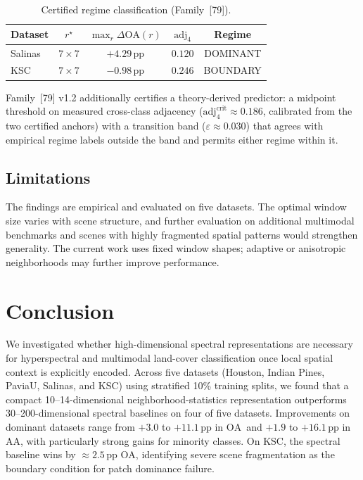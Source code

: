 \documentclass[journal]{IEEEtran}
\newcommand{\pp}{\,\text{pp}}
\newcommand{\OA}{\ensuremath{\mathrm{OA}}}
\newcommand{\Acc}{\ensuremath{\mathrm{AA}}}  %
\newcommand{\AdjSalinas}{0.120} %
\newcommand{\AdjKSC}{0.246}     %
\begin{document}
\begin{table}[t]
\centering
\caption{Certified regime classification (Family~[79]).}
\label{tab:regime-separator}
\begin{tabular}{lcccc}
\hline
Dataset & $r^\star$ & $\max_r \Delta\mathrm{OA}(r)$ & $\mathrm{adj}_4$ & Regime \\
\hline
Salinas & $7{\times}7$ & $+4.29\pp$ & $\AdjSalinas$ & DOMINANT \\
KSC     & $7{\times}7$ & $-0.98\pp$ & $\AdjKSC$     & BOUNDARY \\
\hline
\end{tabular}
\end{table}

Family~[79] v1.2 additionally certifies a theory-derived predictor: a
midpoint threshold on measured cross-class adjacency
($\mathrm{adj}_4^\mathrm{crit} \approx 0.186$, calibrated from the
two certified anchors) with a transition band ($\varepsilon \approx
0.030$) that agrees with empirical regime labels outside the band and
permits either regime within it.

\subsection{Limitations}

The findings are empirical and evaluated on five datasets. The
optimal window size varies with scene structure, and further
evaluation on additional multimodal benchmarks and scenes with highly
fragmented spatial patterns would strengthen generality. The current
work uses fixed window shapes; adaptive or anisotropic neighborhoods
may further improve performance.

\section{Conclusion}
\label{sec:conclusion}

We investigated whether high-dimensional spectral representations
are necessary for hyperspectral and multimodal land-cover
classification once local spatial context is explicitly encoded.
Across five datasets (Houston, Indian Pines, PaviaU, Salinas, and KSC)
using stratified 10\% training splits, we found that a compact
10--14-dimensional neighborhood-statistics representation outperforms
30--200-dimensional spectral baselines on four of five datasets.
Improvements on dominant datasets range from $+3.0$ to $+11.1\pp$
in \OA\ and $+1.9$ to $+16.1\pp$ in \Acc, with particularly strong
gains for minority classes. On KSC, the spectral baseline wins by
${\approx}2.5\pp$ \OA, identifying severe scene fragmentation as the
boundary condition for patch dominance failure.
\end{document}
